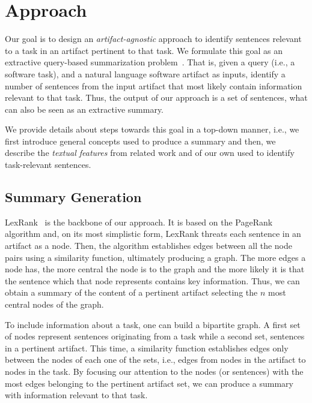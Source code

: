 \section{Approach}
\label{cp5:approaches}


Our goal is to design an \textit{artifact-agnostic} approach
to identify sentences relevant to a task in an artifact pertinent to that task.
We formulate this goal as an extractive query-based summarization problem~\cite{Goldsteinet1999}.
That is, given a query (i.e., a software task),
and a natural language software artifact as inputs,
identify a number of sentences from the input artifact that
most likely contain information relevant to that task. 
Thus, the output of our approach is a set of sentences,
what can also be seen as an extractive summary.



We provide details about steps towards this goal
in a top-down manner, i.e., we first introduce general concepts
used to produce a summary and then, we describe
the \textit{textual features} from related work and of our own used to identify task-relevant sentences.




\subsection{Summary Generation}


LexRank~\cite{Erkan2004} is the backbone of our approach. 
It is based on the PageRank~\cite{Page1999} algorithm
and, on its most simplistic form, LexRank threats each sentence in an artifact as a node.
Then, the algorithm
establishes edges between all the node pairs using a similarity function, ultimately producing a graph. 
The more edges a node has, the more central the node is to the graph and the more likely it is that the sentence which that node represents contains key information. 
Thus, we can obtain a summary of the content of a pertinent artifact selecting the $n$ most central nodes of the graph. 


To include information about a task, one can build a bipartite graph.
A first set of nodes represent sentences originating from a task while a second set, sentences in a pertinent artifact.
This time,  a similarity function 
establishes edges only between the nodes of each one of the sets, i.e., edges from nodes in the artifact to nodes in the task.
By focusing our attention to the nodes (or sentences) with the most edges belonging to the pertinent artifact set, we can produce a summary with information relevant to that task.




